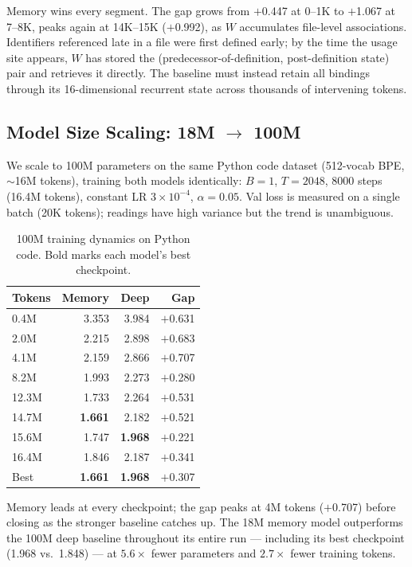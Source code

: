\documentclass{article}
\begin{document}
Memory wins every segment. The gap grows from $+$0.447 at 0--1K to $+$1.067 at 7--8K, peaks again at 14K--15K ($+$0.992), as $W$ accumulates file-level associations. Identifiers referenced late in a file were first defined early; by the time the usage site appears, $W$ has stored the (predecessor-of-definition, post-definition state) pair and retrieves it directly. The baseline must instead retain all bindings through its 16-dimensional recurrent state across thousands of intervening tokens.

\FloatBarrier
\subsection{Model Size Scaling: 18M $\to$ 100M}

We scale to 100M parameters on the same Python code dataset (512-vocab BPE, ${\sim}$16M tokens), training both models identically: $B{=}1$, $T{=}2048$, 8000 steps (16.4M tokens), constant LR $3{\times}10^{-4}$, $\alpha{=}0.05$. Val loss is measured on a single batch (20K tokens); readings have high variance but the trend is unambiguous.

\begin{table}[h]
\centering
\caption{100M training dynamics on Python code. Bold marks each model's best checkpoint.}
\begin{tabular}{lrrr}
\toprule
Tokens & Memory & Deep & Gap \\
\midrule
0.4M  & 3.353 & 3.984 & $+$0.631 \\
2.0M  & 2.215 & 2.898 & $+$0.683 \\
4.1M  & 2.159 & 2.866 & $+$0.707 \\
8.2M  & 1.993 & 2.273 & $+$0.280 \\
12.3M & 1.733 & 2.264 & $+$0.531 \\
14.7M & \textbf{1.661} & 2.182 & $+$0.521 \\
15.6M & 1.747 & \textbf{1.968} & $+$0.221 \\
\midrule
16.4M & 1.846 & 2.187 & $+$0.341 \\
\midrule
Best  & \textbf{1.661} & \textbf{1.968} & $+$0.307 \\
\bottomrule
\end{tabular}
\end{table}

Memory leads at every checkpoint; the gap peaks at 4M tokens ($+$0.707) before closing as the stronger baseline catches up. The 18M memory model outperforms the 100M deep baseline throughout its entire run --- including its best checkpoint (1.968 vs.\ 1.848) --- at $5.6\times$ fewer parameters and $2.7\times$ fewer training tokens.
\end{document}

